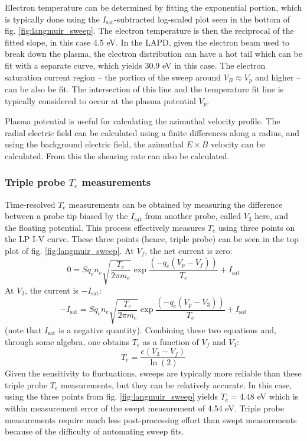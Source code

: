 Electron temperature can be determined by fitting the exponential portion, which is typically done using the $I_\text{sat}$-subtracted log-scaled plot seen in the bottom of fig. \ref{fig:langmuir_sweep}. The electron temperature is then the reciprocal of the fitted slope, in this case 4.5 eV. In the LAPD, given the electron beam used to break down the plasma, the electron distribution can have a hot tail which can be fit with a separate curve, which yields 30.9 eV in this case. The electron saturation current region -- the portion of the sweep around $V_B \approx V_p$ and higher -- can be also be fit. The intersection of this line and the temperature fit line is typically considered to occur at the plasma potential $V_p$. 

Plasma potential is useful for calculating the azimuthal velocity profile. The radial electric field can be calculated using a finite differences along a radius, and using the background electric field, the azimuthal $E \times B$ velocity can be calculated. From this the shearing rate can also be calculated.

\subsubsection{Triple probe $T_e$ measurements}
Time-resolved $T_e$ measurements can be obtained by measuring the difference between a probe tip biased by the $I_\text{sat}$ from another probe, called $V_3$ here, and the floating potential. This process effectively measures $T_e$ using three points on the LP I-V curve. These three points (hence, triple probe) can be seen in the top plot of fig. \ref{fig:langmuir_sweep}. At $V_f$, the net current is zero: 
\begin{equation}
	0 = S q_e n_e \sqrt{\frac{T_e}{2 \pi m_e}} \exp \frac{(- q_e (V_p - V_f))}{T_e} + I_\text{sat}
\end{equation}
At $V_3$, the current is $- I_\text{sat}$:
\begin{equation}
	-I_\text{sat} = S q_e n_e \sqrt{\frac{T_e}{2 \pi m_e}} \exp \frac{(- q_e (V_p - V_3))}{T_e} + I_\text{sat}
\end{equation}
(note that $I_\text{sat}$ is a negative quantity).
Combining these two equations and, through some algebra, one obtains $T_e$ as a function of $V_f$ and $V_3$:
\begin{equation}
	T_e = \frac{e (V_3 - V_f)}{\ln(2)}
\end{equation}
Given the sensitivity to fluctuations, sweeps are typically more reliable than these triple probe $T_e$ measurements, but they can be relatively accurate. In this case, using the three points from fig. \ref{fig:langmuir_sweep} yields $T_e = 4.48$ eV which is within measurement error of the swept measurement of 4.54 eV. Triple probe measurements require much less post-processing effort than swept measurements because of the difficulty of automating sweep fits. 

